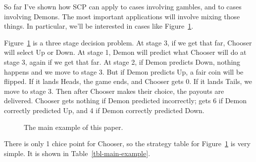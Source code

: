 \documentclass[
  10pt,
  letterpaper,
  DIV=11,
  numbers=noendperiod,
  twoside]{scrartcl}
\begin{document}
So far I've shown how SCP can apply to cases involving gambles, and to
cases involving Demons. The most important applications will involve
mixing those things. In particular, we'll be interested in cases like
Figure~\ref{fig-main-example}.

Figure~\ref{fig-main-example} is a three stage decision problem. At
stage 3, if we get that far, Chooser will select Up or Down. At stage 1,
Demon will predict what Chooser will do at stage 3, again if we get that
far. At stage 2, if Demon predicts Down, nothing happens and we move to
stage 3. But if Demon predicts Up, a fair coin will be flipped. If it
lands Heads, the game ends, and Chooser gets 0. If it lands Tails, we
move to stage 3. Then after Chooser makes their choice, the payouts are
delivered. Chooser gets nothing if Demon predicted incorrectly; gets 6
if Demon correctly predicted Up, and 4 if Demon correctly predicted
Down.

\begin{figure}


\caption{\label{fig-main-example}The main example of this paper.}

\end{figure}%

There is only 1 chice point for Chooser, so the strategy table for
Figure~\ref{fig-main-example} is very simple. It is shown in
Table~\ref{tbl-main-example}.
\end{document}
